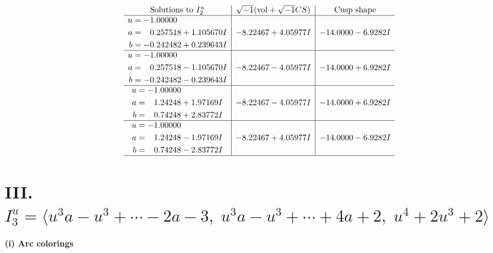 \documentclass[1p]{elsarticle_modified}
\theoremstyle{definition}
\newcommand{\I}{\sqrt{-1}}
\begin{document}
$$\begin{array}{c|c|c}  
\text{Solutions to }I^u_{2}& \I (\text{vol} + \sqrt{-1}CS) & \text{Cusp shape}\\
 \hline 
\begin{aligned}
u &= -1.00000\phantom{ +0.000000I} \\
a &= \phantom{-}0.257518 + 1.105670 I \\
b &= -0.242482 + 0.239643 I\end{aligned}
 & -8.22467 + 4.05977 I & -14.0000 - 6.9282 I \\ \hline\begin{aligned}
u &= -1.00000\phantom{ +0.000000I} \\
a &= \phantom{-}0.257518 - 1.105670 I \\
b &= -0.242482 - 0.239643 I\end{aligned}
 & -8.22467 - 4.05977 I & -14.0000 + 6.9282 I \\ \hline\begin{aligned}
u &= -1.00000\phantom{ +0.000000I} \\
a &= \phantom{-}1.24248 + 1.97169 I \\
b &= \phantom{-}0.74248 + 2.83772 I\end{aligned}
 & -8.22467 - 4.05977 I & -14.0000 + 6.9282 I \\ \hline\begin{aligned}
u &= -1.00000\phantom{ +0.000000I} \\
a &= \phantom{-}1.24248 - 1.97169 I \\
b &= \phantom{-}0.74248 - 2.83772 I\end{aligned}
 & -8.22467 + 4.05977 I & -14.0000 - 6.9282 I\\
 \hline 
 \end{array}$$\newpage\newpage\renewcommand{\arraystretch}{1}
\centering \section*{III. $I^u_{3}= \langle u^3 a- u^3+\cdots-2 a-3,\;u^3 a- u^3+\cdots+4 a+2,\;u^4+2 u^3+2 \rangle$}
\flushleft \textbf{(i) Arc colorings}\\
\end{document}
